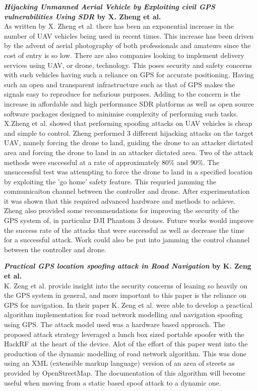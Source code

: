 \textbf{\emph{Hijacking Unmanned Aerial Vehicle by Exploiting civil GPS vulnerabilities Using SDR} by X. Zheng et al.}\\
As written by X. Zheng et al. \cite{RN4} there has been an exponential increase in the number of UAV vehicles being used in recent times.
This increase has been driven by the advent of aerial photography of both professionals and amateurs since the cost of entry is so low. There are
also companies looking to implement delivery services using UAV, or drone, technology.
This poses security and safety concerns with such vehicles having such a reliance on GPS for accurate positioning. Having such an open and transparent
infrastructure such as that of GPS makes the signals easy to reproduce for nefarious purposes. Adding to the concern is the increase in 
affordable and high performance SDR platforms as well as open source software packages designed to minimise complexity of performing such tasks. X.Zheng et al.
showed that performing spoofing attacks on UAV vehicles is cheap and simple to control. Zheng performed 3 different hijacking attacks on the target
UAV, namely forcing the drone to land, guiding the drone to an attacker dictated area and forcing the drone to land in an attacker dictated area.
Two of the attack methods were successful at a rate of approximately 80\% and 90\%. The unsuccessful test was attempting to force the drone to land in a specified location by exploiting the 
'go home' safety feature. This requried jamming the communicaiton channel between the controller and drone. After experimentation it was shown
that this required advanced hardware and methods to achieve. Zheng also provided some recommendations for improving the security of the GPS system of, in particular
DJI Phantom 3 drones.
Future works would improve the success rate of the attacks that were successful as well as decrease the time for a successful attack. Work could 
also be put into jamming the control channel between the controller and drone.

\medskip

\textbf{\emph{Practical GPS location spoofing attack in Road Navigation} by K. Zeng et al.} \\
K. Zeng et al. provide insight into the security concerns of leaning so heavily on the GPS system in general, and more important to this
paper is the reliance on GPS for navigation. In their paper \cite{RN9} K. Zeng et al. were able to develop a practical algorithm
implementation for road network modelling and navigation spoofing using GPS. The attack model used was a hardware based approach. 
The proposed attack strategy leveraged a lunch box sized portable spoofer with the HackRF at the heart of the device. Alot of the effort
of this paper went into the production of the dynamic modelling of road network algorithm. This was done using an XML (extensible markup language)
version of an area of streets as provided by OpenStreetMap. The documentation of this algorithm will become 
useful when moving from a static based spoof attack to a dynamic one.

